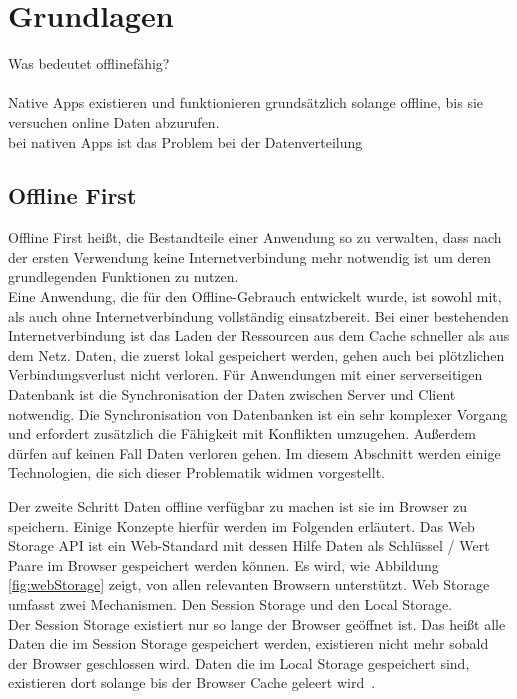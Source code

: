 \chapter{\label{chap:grundlagen}Grundlagen}
Was bedeutet offlinefähig?\\
\\
Native \Glspl{App} existieren und funktionieren grundsätzlich solange offline, bis sie versuchen online Daten abzurufen.\\
bei nativen Apps ist das Problem bei der Datenverteilung
%
%
\section{Offline First}
Offline First heißt, die Bestandteile einer Anwendung so zu verwalten, dass nach der ersten Verwendung keine Internetverbindung mehr notwendig ist um deren grundlegenden Funktionen zu nutzen.\\
Eine Anwendung, die für den Offline-Gebrauch entwickelt wurde, ist sowohl mit, als auch ohne Internetverbindung vollständig einsatzbereit. Bei einer bestehenden Internetverbindung ist das Laden der Ressourcen aus dem Cache schneller als aus dem Netz. Daten, die zuerst lokal gespeichert werden, gehen auch bei plötzlichen Verbindungsverlust nicht verloren.
Für Anwendungen mit einer serverseitigen Datenbank ist die Synchronisation der Daten zwischen Server und Client notwendig. Die Synchronisation von Datenbanken ist ein sehr komplexer Vorgang und erfordert zusätzlich die Fähigkeit mit Konflikten umzugehen. Außerdem dürfen auf keinen Fall Daten verloren gehen. Im diesem Abschnitt werden einige Technologien, die sich dieser Problematik widmen vorgestellt.
%
%

%
%
%
Der zweite Schritt Daten offline verfügbar zu machen ist sie im Browser zu speichern. Einige Konzepte hierfür werden im Folgenden erläutert.
%
Das Web Storage \gls{API} ist ein Web-Standard mit dessen Hilfe Daten als Schlüssel / Wert Paare im Browser gespeichert werden können. Es wird, wie Abbildung \ref{fig:webStorage} zeigt, von allen relevanten Browsern unterstützt.
Web Storage umfasst zwei Mechanismen. Den Session Storage und den Local Storage.\\
Der Session Storage existiert nur so lange der Browser geöffnet ist.
Das heißt alle Daten die im Session Storage gespeichert werden, existieren nicht mehr sobald der Browser geschlossen wird. Daten die im Local Storage gespeichert sind, existieren dort solange bis der Browser Cache geleert wird~\cite{webstorage}.

